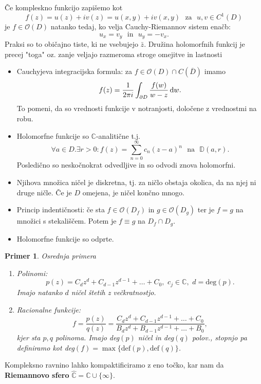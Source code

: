 \documentclass{article}
\newtheorem{primer}{Primer}
\newcommand{\C}{\mathbb{C}}
\newcommand{\D}{\mathbb{D}}
\newcommand{\Ho}{\mathcal{O}}
\begin{document}
Če kompleskno funkcijo zapišemo kot 
$$
f(z) = u(z) + iv(z) = u(x, y) + iv(x, y) \,\, \text{ za } \,\, u, v\in C^1(D)
$$
je $f\in \Ho(D)$ natanko tedaj, ko velja Cauchy-Riemannov sistem 
enačb:
\begin{equation}
u_x = v_y \,\,\text{ in }\,\, u_y = -v_x.
\end{equation}
Praksi so to običajno tiste, ki ne vsebujejo $\bar{z}$.
\noindent
Družina holomorfnih funkcij je precej "toga" oz. 
zanje veljajo razmeroma stroge omejitve in lastnosti 
\begin{itemize}
    \item Cauchyjeva integracijska formula: za $f\in \Ho(D) \cap C(\overline{D})$
    imamo 
    \begin{equation}
    f(z) = \frac{1}{2\pi i} \int_{\partial D} \frac{f(w)}{w - z} \dif w.
    \end{equation}
    To pomeni, da so vrednosti funkcije v notranjosti, določene z vrednostmi na robu.
    \item Holomorfne funkcije so $\C$-analitične t.j. 
    $$
    \forall a\in D. \exists r > 0: f(z) = \sum_{n=0}^\infty c_n(z- a)^n \,\, \text{ na }\,\, \D(a, r).
    $$
    Posledično so neskočnokrat odvedljive in so odvodi znova holomorfni.
    \item Njihova množica ničel je diskretna, tj. za ničlo 
    obstaja okolica, da na njej ni druge ničle. Če je $D$ omejena, 
    je ničel končno mnogo.
    \item Princip indentičnosti: če sta $f\in \Ho(D_f)$ in $g\in \Ho(D_g)$
    ter je $f = g$ na množici s stekališčem. Potem je 
    $f \equiv g $ na $D_f \cap D_g$. 
    \item Holomorfne funkcije so odprte. 
\end{itemize}

\begin{primer}
Osrednja primera 
\hfill 
\begin{enumerate}
    \item[i)] Polinomi: 
    $$
    p(z) = C_d z^d + C_{d-1} z^{d-1} + \dots + C_0, \,\, c_j \in \C, \,\, d = \text{deg}(p). 
    $$
    Imajo natanko $d$ ničel štetih z večkratnostjo. 
    \item[ii)] Racionalne funkcije: 
    $$
    f = \frac{p(z)}{q(z)} = \frac{C_d z^d + C_{d-1} z^{d-1} + \dots + C_0}{B_d z^d + B_{d-1} z^{d-1} + \dots + B_0},
    $$
    kjer sta $p, q$ polinoma. Imajo deg$(p)$ ničel in deg$(q)$ polov., stopnjo 
    pa definiramo kot deg$(f) = \max\{\text{def}(p), \text{def}(q)\}$.
\end{enumerate}
\end{primer}
\noindent
Kompleksno ravnino lahko kompaktificiramo z eno točko, kar nam da \textbf{Riemannovo sfero} $\hat{\C} = \C \cup \{\infty\}$.\\
\end{document}
